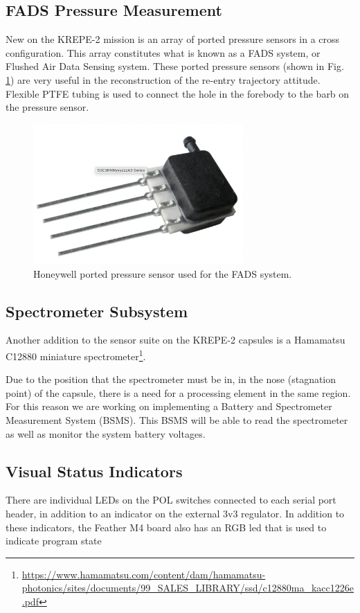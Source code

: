 \documentclass{article}
\begin{document}
\subsection{FADS Pressure Measurement}
New on the KREPE-2 mission is an array of ported pressure sensors in a cross configuration. This array constitutes what is known as a FADS system, or Flushed Air Data Sensing system. These ported pressure sensors (shown in Fig. \ref{fig:pressure-sensor}) are very useful in the reconstruction of the re-entry trajectory attitude. Flexible PTFE tubing is used  to connect the hole in the forebody to the barb on the pressure sensor.

\begin{figure}[H]
\centering
\includegraphics[width=8cm]{images/honeywell-sensor}
\caption{Honeywell ported pressure sensor used for the FADS system. }
\label{fig:pressure-sensor}
\end{figure}

\subsection{Spectrometer Subsystem}
Another addition to the sensor suite on the KREPE-2 capsules is a Hamamatsu C12880 miniature spectrometer\footnote{\url{https://www.hamamatsu.com/content/dam/hamamatsu-photonics/sites/documents/99_SALES_LIBRARY/ssd/c12880ma_kacc1226e.pdf}}.

Due to the position that the spectrometer must be in, in the nose (stagnation point) of the capsule, there is a need for a processing element in the same region. For this reason we are working on implementing a Battery and Spectrometer Measurement System (BSMS). This BSMS will be able to read the spectrometer as well as monitor the system battery voltages. 


\subsection{Visual Status Indicators}
There are individual LEDs on the POL switches connected to each serial port header, in addition to an indicator on the external 3v3 regulator. In addition to these indicators, the Feather M4 board also has an RGB led that is used to indicate program state
\end{document}
